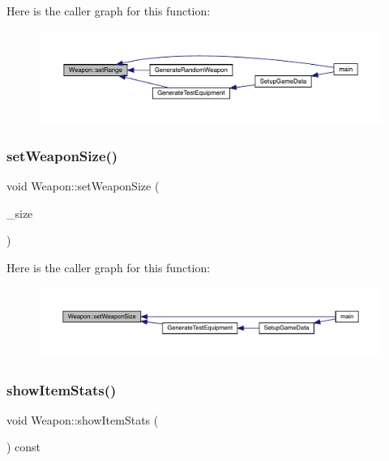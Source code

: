 Here is the caller graph for this function\+:
\nopagebreak
\begin{figure}[H]
\begin{center}
\leavevmode
\includegraphics[width=350pt]{class_weapon_aa6f690fe5e69ce11628b245739c74dc5_icgraph}
\end{center}
\end{figure}
\mbox{\label{class_weapon_a78e4b6c131a25e93f647594191bae38d}} 
\subsubsection{\texorpdfstring{set\+Weapon\+Size()}{setWeaponSize()}}
{\footnotesize\ttfamily void Weapon\+::set\+Weapon\+Size (\begin{DoxyParamCaption}\item[{\mbox{\hyperlink{_weapon_8hpp_a160076f6c574c69cd1ce2b3f42cf3755}{En\+Weapon\+Size}}}]{\+\_\+size }\end{DoxyParamCaption})}

Here is the caller graph for this function\+:
\nopagebreak
\begin{figure}[H]
\begin{center}
\leavevmode
\includegraphics[width=350pt]{class_weapon_a78e4b6c131a25e93f647594191bae38d_icgraph}
\end{center}
\end{figure}
\mbox{\label{class_weapon_a5bd0118be0d84307c0865a63d907fec7}} 
\subsubsection{\texorpdfstring{show\+Item\+Stats()}{showItemStats()}}
{\footnotesize\ttfamily void Weapon\+::show\+Item\+Stats (\begin{DoxyParamCaption}{ }\end{DoxyParamCaption}) const\hspace{0.3cm}{\ttfamily [virtual]}}




